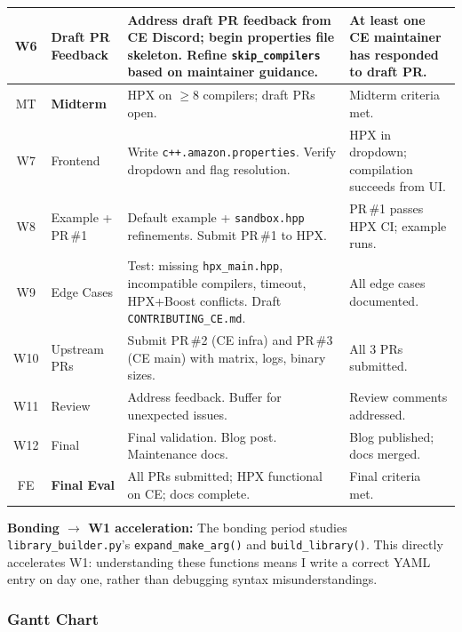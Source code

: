 \documentclass[11pt, a4paper]{article}
\newcommand{\code}[1]{\texttt{#1}}
\newcommand{\cefile}[1]{\texttt{#1}}
\begin{document}
\begin{longtable}{|c|p{2.2cm}|p{5.8cm}|p{3.5cm}|}
W6 & Draft PR Feedback &
  Address draft PR feedback from CE Discord; begin properties
  file skeleton.  Refine \code{skip\_compilers} based on
  maintainer guidance.
  & At least one CE maintainer has responded to draft PR. \\
\hline

\rowcolor{rowgray}
MT & \textbf{Midterm} &
  HPX on $\geq$8 compilers; draft PRs open.
  & Midterm criteria met. \\
\hline

W7 & Frontend &
  Write \code{c++.amazon.properties}.
  Verify dropdown and flag resolution.
  & HPX in dropdown; compilation succeeds from UI. \\
\hline

W8 & Example + PR\,\#1 &
  Default example + \code{sandbox.hpp} refinements.
  Submit PR\,\#1 to HPX.
  & PR\,\#1 passes HPX CI; example runs. \\
\hline

W9 & Edge Cases &
  Test: missing \code{hpx\_main.hpp}, incompatible compilers,
  timeout, HPX+Boost conflicts.  Draft \code{CONTRIBUTING\_CE.md}.
  & All edge cases documented. \\
\hline

W10 & Upstream PRs &
  Submit PR\,\#2 (CE infra) and PR\,\#3 (CE main) with
  matrix, logs, binary sizes.
  & All 3 PRs submitted. \\
\hline

W11 & Review &
  Address feedback.  Buffer for unexpected issues.
  & Review comments addressed. \\
\hline

W12 & Final &
  Final validation.  Blog post.  Maintenance docs.
  & Blog published; docs merged. \\
\hline

\rowcolor{rowgray}
FE & \textbf{Final Eval} &
  All PRs submitted; HPX functional on CE; docs complete.
  & Final criteria met. \\
\hline
\end{longtable}

\textbf{Bonding $\to$ W1 acceleration:} The bonding period studies
\cefile{library\_builder.py}'s \code{expand\_make\_arg()} and
\code{build\_library()}.  This directly accelerates W1: understanding
these functions means I write a correct YAML entry on day one, rather
than debugging syntax misunderstandings.

\subsubsection*{Gantt Chart}
\end{document}
